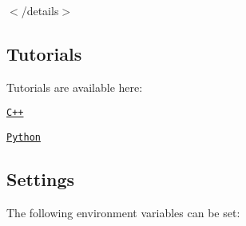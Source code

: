 $<$/details$>$

\subsection*{Tutorials}

Tutorials are available here\+:


\begin{DoxyItemize}
\item \href{./tutorials/cpp}{\tt C++}
\item \href{./tutorials/python}{\tt Python}
\end{DoxyItemize}

\subsection*{Settings}

The following environment variables can be set\+:

